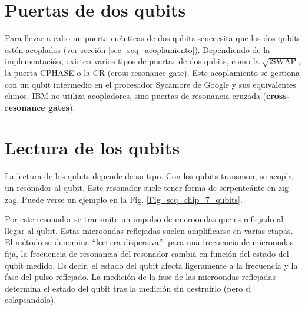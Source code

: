  


\newpage
\section{Puertas de dos qubits} \label{sec_scq_puertas_2_qubits}

Para llevar a cabo un puerta cuánticas de dos qubits senecesita que los dos qubits estén acoplados (ver sección \ref{sec_scq_acoplamiento}). Dependiendo de la implementación, existen varios tipos de puertas de dos qubits, como la $\sqrt{\text{iSWAP}}$, la puerta CPHASE o la CR (cross-resonance gate). Este acoplamiento se gestiona con un qubit intermedio en el procesador Sycamore de Google y sus equivalentes chinos. IBM no utiliza acopladores, sino puertas de resonancia cruzada (\textbf{cross-resonance gates}).





\section{Lectura de los qubits}

La lectura de los qubits depende de su tipo. Con los qubits transmon, se acopla un resonador al qubit. Este resonador suele tener forma de serpenteánte en zig-zag. Puede verse un ejemplo en la Fig. \ref{Fig_scq_chip_7_qubits}.

Por este resonador se transmite un impulso de microondas que es reflejado al llegar al qubit. Estas microondas reflejadas suelen amplificarse en varias etapas. El método se denomina ``lectura dispersiva'': para una frecuencia de microondas fija, la frecuencia de resonancia del resonador cambia en función del estado del qubit medido. Es decir, el estado del qubit afecta ligeramente a la frecuencia y la fase del pulso reflejado. La medición de la fase de las microondas reflejadas determina el estado del qubit tras la medición sin destruirlo (pero si colapsandolo).  



